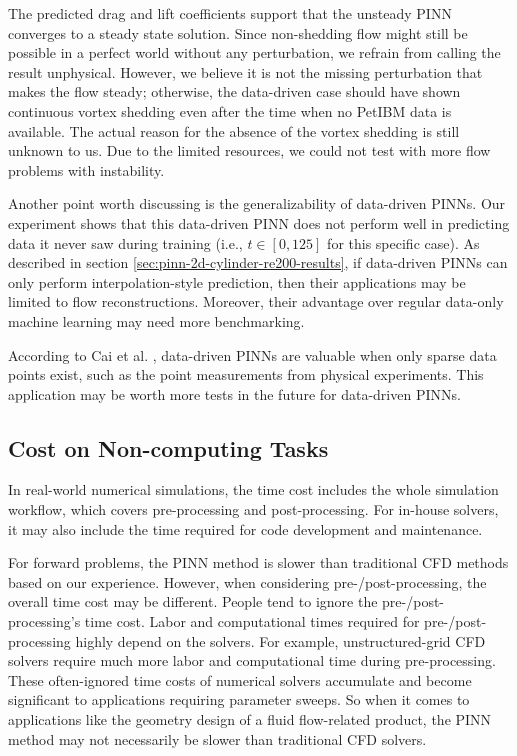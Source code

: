 The predicted drag and lift coefficients support that the unsteady PINN converges to a steady state solution.
Since non-shedding flow might still be possible in a perfect world without any perturbation, we refrain from calling the result unphysical.
However, we believe it is not the missing perturbation that makes the flow steady; otherwise, the data-driven case should have shown continuous vortex shedding even after the time when no PetIBM data is available.
The actual reason for the absence of the vortex shedding is still unknown to us.
Due to the limited resources, we could not test with more flow problems with instability.

Another point worth discussing is the generalizability of data-driven PINNs.
Our experiment shows that this data-driven PINN does not perform well in predicting data it never saw during training (i.e., $t \in [0, 125]$ for this specific case).
As described in section \ref{sec:pinn-2d-cylinder-re200-results}, if data-driven PINNs can only perform interpolation-style prediction, then their applications may be limited to flow reconstructions.
Moreover, their advantage over regular data-only machine learning may need more benchmarking.

According to Cai et al. \cite{cai_physics-informed_2021}, data-driven PINNs are valuable when only sparse data points exist, such as the point measurements from physical experiments.
This application may be worth more tests in the future for data-driven PINNs.

\subsection*{Cost on Non-computing Tasks}

In real-world numerical simulations, the time cost includes the whole simulation workflow, which covers pre-processing and post-processing.
For in-house solvers, it may also include the time required for code development and maintenance.

For forward problems, the PINN method is slower than traditional CFD methods based on our experience.
However, when considering pre-/post-processing, the overall time cost may be different.
People tend to ignore the pre-/post-processing's time cost.
Labor and computational times required for pre-/post-processing highly depend on the solvers.
For example, unstructured-grid CFD solvers require much more labor and computational time during pre-processing.
These often-ignored time costs of numerical solvers accumulate and become significant to applications requiring parameter sweeps.
So when it comes to applications like the geometry design of a fluid flow-related product, the PINN method may not necessarily be slower than traditional CFD solvers.

